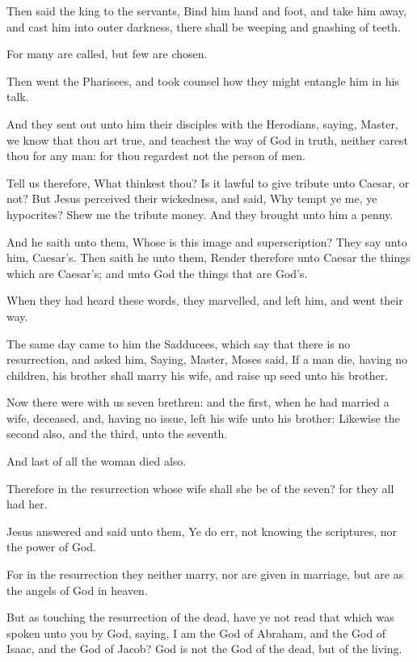 \verse Then said the king to the servants, Bind him hand and foot, and take him away, and cast him into outer darkness, there shall be weeping and gnashing of teeth.

\verse For many are called, but few are chosen.

\verse Then went the Pharisees, and took counsel how they might entangle him in his talk.

\verse And they sent out unto him their disciples with the Herodians, saying, Master, we know that thou art true, and teachest the way of God in truth, neither carest thou for any man: for thou regardest not the person of men.

\verse Tell us therefore, What thinkest thou? Is it lawful to give tribute unto Caesar, or not?  \verse But Jesus perceived their wickedness, and said, Why tempt ye me, ye hypocrites?  \verse Shew me the tribute money. And they brought unto him a penny.

\verse And he saith unto them, Whose is this image and superscription?  \verse They say unto him, Caesar's. Then saith he unto them, Render therefore unto Caesar the things which are Caesar's; and unto God the things that are God's.

\verse When they had heard these words, they marvelled, and left him, and went their way.

\verse The same day came to him the Sadducees, which say that there is no resurrection, and asked him, \verse Saying, Master, Moses said, If a man die, having no children, his brother shall marry his wife, and raise up seed unto his brother.

\verse Now there were with us seven brethren: and the first, when he had married a wife, deceased, and, having no issue, left his wife unto his brother: \verse Likewise the second also, and the third, unto the seventh.

\verse And last of all the woman died also.

\verse Therefore in the resurrection whose wife shall she be of the seven?  for they all had her.

\verse Jesus answered and said unto them, Ye do err, not knowing the scriptures, nor the power of God.

\verse For in the resurrection they neither marry, nor are given in marriage, but are as the angels of God in heaven.

\verse But as touching the resurrection of the dead, have ye not read that which was spoken unto you by God, saying, \verse I am the God of Abraham, and the God of Isaac, and the God of Jacob?  God is not the God of the dead, but of the living.

